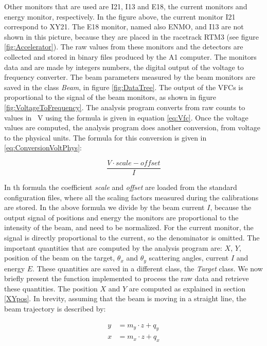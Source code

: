Other monitors that are used are I21, I13 and E18, the current monitors and energy monitor, respectively. In the figure above, the current monitor I21 correspond to XY21. The E18 monitor, named also ENMO, and I13 are not shown in this picture, because they are placed in the racetrack RTM3 (see figure \ref{fig:Accelerator}). 
The raw values from these monitors and the detectors are collected and stored in binary files produced by the A1 computer. The monitors data and are made by integers numbers, the digital output of the voltage to frequency converter. 
The beam parameters measured by the beam monitors are saved in the class \textit{Beam}, in figure \ref{fig:DataTree}.
The output of the VFCs is proportional to the signal of the beam monitors, as shown in figure \ref{fig:VoltageToFrequency}. The analysis program converts from raw counts to values in \SI{}{\volt} using the formula is given in equation \ref{eq:Vfc}. Once the voltage values are computed, the analysis program does another conversion, from voltage to the physical units. The formula for this conversion is given in \ref{eq:ConversionVoltPhys}:

\begin{equation} \label{eq:ConversionVoltPhys}
\dfrac{V \cdot scale - offset}{I}
\end{equation}

In th formula the coefficient \textit{scale} and \textit{offset} are loaded from the standard configuration files, where all the scaling factors measured during the calibrations are stored.
In the above formula we divide by the beam current $I$, because the output signal of positions and energy the monitors are proportional to the intensity of the beam, and need to be normalized. For the current monitor, the signal is directly proportional to the current, so the denominator is omitted.
The important quantities that are computed by the analysis program are: $X$, $Y$, position of the beam on the target, $\theta_{x}$ and $\theta_{y}$ scattering angles, current $I$ and energy $E$. These quantities are saved in a different class, the \textit{Target} class.
We now briefly present the function implemented to process the raw data and retrieve these quantities.
The position $X$ and $Y$ are computed as explained in section \ref{XYpos}. In brevity, assuming that the beam is moving in a straight line, the  beam trajectory is described by:

\begin{align*}
y &= m_{y} \cdot z + q_{y} \\
x &= m_{x} \cdot z + q_{x}
\end{align*}

